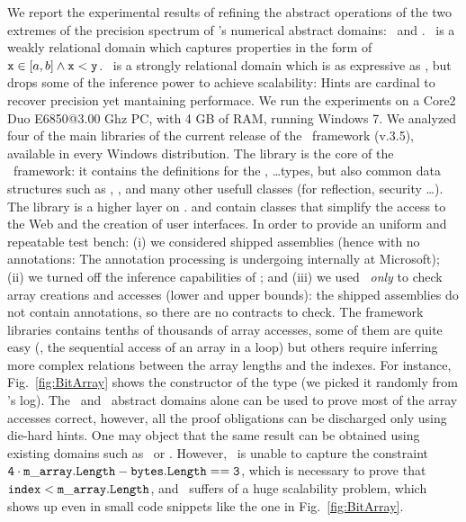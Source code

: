 \documentclass{llncs}
\begin{document}
We report the experimental results of refining the abstract
operations of the two extremes of the precision spectrum of \Clousot's numerical abstract domains: \Pentagons\ and \SubPolyhedra.
\Pentagons\ is a weakly relational domain which captures properties in the form of $\mathtt{x} \in [a, b] \wedge \mathtt{x} < \mathtt{y}$.
\SubPolyhedra\ is a strongly relational domain which is as expressive as \Polyhedra, but drops some of the inference power to achieve scalability: Hints are cardinal to recover precision yet mantaining performace.
We run the experiments on a  Core2 Duo  E6850@3.00 Ghz PC, with 4 GB of RAM, running Windows 7.
We analyzed four of the main libraries of the current release of the \NET\ framework (v.3.5), available in every Windows distribution.
The   library is the core of the \NET\ framework: it contains the definitions for the ,  \dots types, but also common data structures such as , , and many other usefull classes (for reflection, security \dots).
The  library is a higher layer on . 
 and  contain classes that simplify the access to the Web and the creation of user interfaces.
In order to provide an uniform and repeatable test bench: (i) we considered shipped assemblies (hence with no annotations: The annotation processing is undergoing internally at Microsoft); (ii) we turned off the inference capabilities of \Clousot; and (iii) we used \Clousot\ \emph{only} to check array creations and accesses (lower and upper bounds): the shipped assemblies do not contain annotations, so there are no contracts to check.
The framework libraries contains tenths of thousands of array accesses, some of them are quite easy (\eg, the sequential access of an array in a  loop) but others require inferring more complex relations between the array lengths and the indexes.
For instance,  Fig.~\ref{fig:BitArray}  shows the constructor of the  type (we picked it randomly from \Clousot's log).
The \Pentagons\ and \SubPolyhedra\ abstract domains alone can be used to prove most of the array accesses correct, however, all the proof obligations can be discharged only using die-hard hints.
One may object that the same result can be obtained using existing domains such as \Octagons\ or \Polyhedra.
However, \Octagons\ is unable to capture the constraint $\mathtt{4\cdot m\_array.Length - \mathtt{bytes.Length} == 3}$, which is necessary to prove that $\mathtt{index} < \mathtt{m\_array.Length}$, and \Polyhedra\ suffers of a huge scalability problem, which shows up even in small code snippets like the one in   Fig.~\ref{fig:BitArray}.
\end{document}
